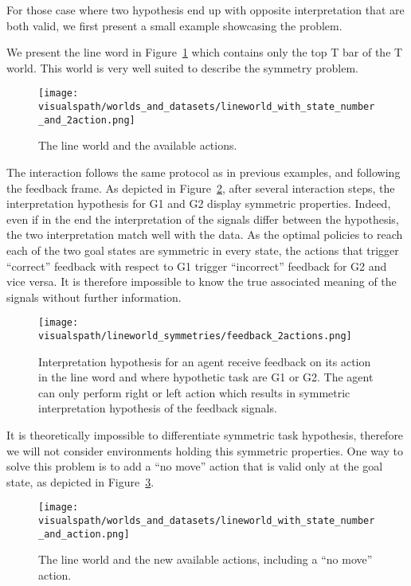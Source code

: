For those case where two hypothesis end up with opposite interpretation that are both valid, we first present a small example showcasing the problem.

We present the line word in Figure~\ref{fig:lineworld} which contains only the top T bar of the T world. This world is very well suited to describe the symmetry problem. 

\begin{figure}[!ht]
  \centering
  \texttt{[image: \\visualspath/worlds\_and\_datasets/lineworld\_with\_state\_number\_and\_2action.png]}
  \caption{The line world and the available actions.}
  \label{fig:lineworld}
\end{figure}

The interaction follows the same protocol as in previous examples, and following the feedback frame. As depicted in Figure~\ref{fig:lineworldfeedback2action}, after several interaction steps, the interpretation hypothesis for G1 and G2 display symmetric properties. Indeed, even if in the end the interpretation of the signals differ between the hypothesis, the two interpretation match well with the data. As the optimal policies to reach each of the two goal states are symmetric in every state, the actions that trigger ``correct'' feedback with respect to G1 trigger ``incorrect'' feedback for G2 and vice versa. It is therefore impossible to know the true associated meaning of the signals without further information.

\begin{figure}[!ht]
  \centering
  \texttt{[image: \\visualspath/lineworld\_symmetries/feedback\_2actions.png]}
  \caption{Interpretation hypothesis for an agent receive feedback on its action in the line word and where hypothetic task are G1 or G2. The agent can only perform right or left action which results in symmetric interpretation hypothesis of the feedback signals.}
  \label{fig:lineworldfeedback2action}
\end{figure}

It is theoretically impossible to differentiate symmetric task hypothesis, therefore we will not consider environments holding this symmetric properties. One way to solve this problem is to add a ``no move'' action that is valid only at the goal state, as depicted in Figure~\ref{fig:lineworld3action}.

\begin{figure}[!ht]
  \centering
  \texttt{[image: \\visualspath/worlds\_and\_datasets/lineworld\_with\_state\_number\_and\_action.png]}
  \caption{The line world and the new available actions, including a ``no move'' action.}
  \label{fig:lineworld3action}
\end{figure}


